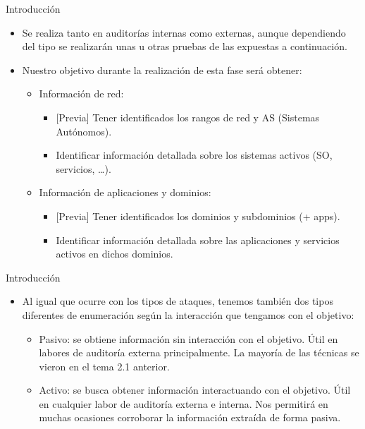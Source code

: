 \documentclass[aspectratio=169,11pt]{beamer}
\begin{document}
\begin{frame}[allowframebreaks]{Introducción}
\small
  \begin{itemize}
  \item Se realiza tanto en auditorías internas como externas, aunque dependiendo del tipo se realizarán unas u otras pruebas de las expuestas a continuación.
  \item Nuestro objetivo durante la realización de esta fase será obtener:
    \begin{itemize}
    \item Información de red:
      \begin{itemize}
      \item {[}Previa] Tener identificados los rangos de red y AS (Sistemas Autónomos).
      \item Identificar información detallada sobre los sistemas activos (SO, servicios, \dots{}).
      \end{itemize}
    \item Información de aplicaciones y dominios:
      \begin{itemize}
      \item {[}Previa] Tener identificados los dominios y subdominios (+ apps).
      \item Identificar información detallada sobre las aplicaciones y servicios activos en dichos dominios.
      \end{itemize}
    \end{itemize}
  \end{itemize}
\end{frame}

\begin{frame}[allowframebreaks]{Introducción}
\small
  \begin{itemize}
  \item Al igual que ocurre con los tipos de ataques, tenemos también dos tipos diferentes de enumeración según la interacción que tengamos con el objetivo:
    \begin{itemize}
    \item Pasivo: se obtiene información sin interacción con el objetivo. Útil en labores de auditoría externa principalmente. La mayoría de las técnicas se vieron en el tema 2.1 anterior.
    \item Activo: se busca obtener información interactuando con el objetivo. Útil en cualquier labor de auditoría externa e interna. Nos permitirá en muchas ocasiones corroborar la información extraída de forma pasiva.
    \end{itemize}
  \end{itemize}
\end{frame}
\end{document}
